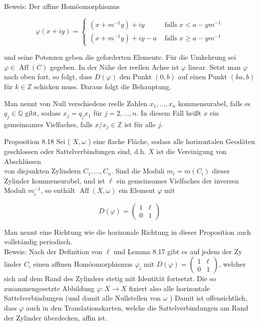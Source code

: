 \documentclass[10pt, letterpaper]{article}
\begin{document}
Beweis: Der affine Homöomorphismus

$$
\varphi(x+i y)= \begin{cases}\left(x+m^{-1} y\right)+i y & \text { falls } x<a-y m^{-1} \\ \left(x+m^{-1} y\right)+i y-a & \text { falls } x \geq a-y m^{-1}\end{cases}
$$

und seine Potenzen geben die geforderten Elemente. Für die Umkehrung sei $\varphi \in \operatorname{Aff}(C)$ gegeben. In der Nähe der reellen Achse ist $\varphi$ linear. Setzt man $\varphi$ nach oben fort, so folgt, dass $D(\varphi)$ den Punkt $(0, b)$ auf einen Punkt $(k a, b)$ für $k \in \mathbb{Z}$ schicken muss. Daraus folgt die Behauptung.

Man nennt von Null verschiedene reelle Zahlen $x_{1}, \ldots, x_{n}$ kommensurabel, falls es $q_{j} \in \mathbb{Q}$ gibt, sodass $x_{j}=q_{j} x_{1}$ für $j=2, \ldots, n$. In diesem Fall heißt $x$ ein gemeinsames Vielfaches, falls $x / x_{j} \in \mathbb{Z}$ ist für alle $j$.

Proposition 8.18 Sei ( $X, \omega$ ) eine flache Fläche, sodass alle horizontalen Geodäten geschlossen oder Sattelverbindungen sind, d.h. $X$ ist die Vereinigung von Abschlüssen\\
von disjunkten Zylindern $C_{1}, \ldots, C_{n}$. Sind die Moduli $m_{i}=m\left(C_{i}\right)$ dieser Zylinder kommensurabel, und ist $\ell$ ein gemeinsames Vielfaches der inversen Moduli $m_{i}^{-1}$, so enthält $\operatorname{Aff}(X, \omega)$ ein Element $\varphi$ mit

$$
D(\varphi)=\left(\begin{array}{ll}
1 & \ell \\
0 & 1
\end{array}\right)
$$

Man nennt eine Richtung wie die horizonale Richtung in dieser Proposition auch vollständig periodisch.\\
Beweis: Nach der Definition von $\ell$ und Lemma 8.17 gibt es auf jedem der Zy linder $C_{i}$ einen affinen Homöomorphismus $\varphi_{i}$ mit $D(\varphi)=\left(\begin{array}{ll}1 & \ell \\ 0 & 1\end{array}\right)$, welcher sich auf dem Rand des Zylinders stetig mit Identität fortsetzt. Die so zusammengesetzte Abbildung $\varphi: X \rightarrow X$ fixiert also alle horizontale Sattelverbindungen (und damit alle Nullstellen von $\omega$ ) Damit ist offensichtlich, dass $\varphi$ auch in den Translationskarten, welche die Sattelverbindungen am Rand der Zylinder überdecken, affin ist.
\end{document}
